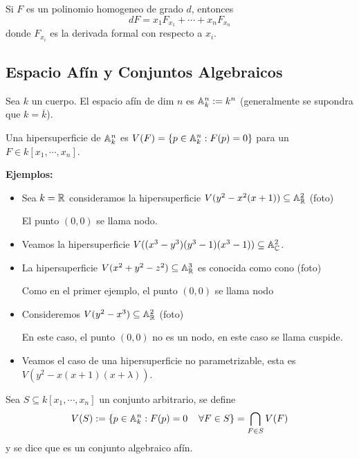 \documentclass{article}
\begin{document}
\begin{teo}
    Si $F$ es un polinomio homogeneo de grado $d$, entonces
    \begin{equation*}
        dF=x_{1}F_{x_{1}}+\cdots+x_{n}F_{x_{n}}
    \end{equation*}
    donde $F_{x_{i}}$ es la derivada formal con respecto a $x_{i}$.
\end{teo}

\subsection{Espacio Afín y Conjuntos Algebraicos}
\begin{dfn}
Sea $k$ un cuerpo. El espacio afín de dim $n$ es $\mathbb{A}_{k}^{n}:=k^{n}$ (generalmente se supondra
que $k=\overline{k}$).
\end{dfn}

\begin{dfn}
    Una hipersuperficie de $\mathbb{A}_{k}^{n}$ es $V(F)=\{p\in\mathbb{A}_{k}^{n}:F(p)=0\}$ para un 
    $F\in k[x_{1},\cdots,x_{n}]$.
\end{dfn}

\noindent\textbf{Ejemplos:}
\begin{itemize}
    \item Sea $k=\mathbb{R}$ consideramos la hipersuperficie $V(y^{2}-x^{2}(x+1))\subseteq\mathbb{A}_{\mathbb{R}}^{2}$ 
    (foto)

    El punto $(0,0)$ se llama nodo.
    \item Veamos la hipersuperficie $V((x^{3}-y^{3})(y^{3}-1)(x^{3}-1))\subseteq\mathbb{A}_{\mathbb{C}}^{2}$.
    \item La hipersuperficie $V(x^{2}+y^{2}-z^{2})\subseteq\mathbb{A}_{\mathbb{R}}^{3}$ es conocida como cono
    (foto)

    Como en el primer ejemplo, el punto $(0,0)$ se llama nodo
    \item Consideremos $V(y^{2}-x^{3})\subseteq\mathbb{A}_{\mathbb{R}}^{2}$ (foto)
    
    En este caso, el punto $(0,0)$ no es un nodo, en este caso se llama cuspide.
    \item Veamos el caso de una hipersuperficie no parametrizable, esta es 
    $V(y^{2}-x(x+1)(x+\lambda))$.
\end{itemize}

\begin{dfn}
    Sea $S\subseteq k[x_{1},\cdots,x_{n}]$ un conjunto arbitrario, se define 
    \begin{equation*}
        V(S):=\{p\in\mathbb{A}_{k}^{n}:F(p)=0\hspace{4mm}\forall F\in S\}=\bigcap_{F\in S} V(F)
    \end{equation*}
    y se dice que es un conjunto algebraico afín.
\end{dfn}
\end{document}
